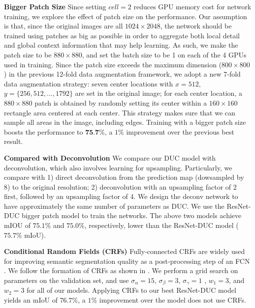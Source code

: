 \documentclass[10pt,twocolumn,letterpaper]{article}
\begin{document}
\textbf{Bigger Patch Size} Since setting $cell=2$ reduces GPU memory cost for network training, we explore the effect of patch size on the performance. Our assumption is that, since the original images are all $1024\times 2048$, the network should be trained using patches as big as possible in order to aggregate both local detail and global context information that may help learning. As such, we make the patch size to be $880\times 880$, and set the batch size to be 1 on each of the 4 GPUs used in training. Since the patch size exceeds the maximum dimension ($800\times 800$) in the previous 12-fold data augmentation framework, we adopt a new 7-fold data augmentation strategy: \iffalse \gary{Why can't you simply use 880-size patches in the same way?}\panqu{because the image is 1024x2048. Previously we use 2x6 configuration. Now since the patch is 880x880, so we can remove the height part.}\fi seven center locations with $x=512$, $y=\{256,512,...,1792\}$ are set in the original image; for each center location, a $880\times 880$ patch is obtained by randomly setting its center within a $160\times 160$ rectangle area centered at each center. This strategy makes sure that we can sample all areas in the image, including edges. Training with a bigger patch size boosts the performance to $\textbf{75.7\%}$, a $1\%$ improvement over the previous best result.

\textbf{Compared with Deconvolution}
We compare our DUC model with deconvolution, which also involves learning for upsampling. Particularly, we compare with 1) direct deconvolution from the prediction map (dowsampled by 8) to the original resolution; 2) deconvolution with an upsampling factor of 2 first, followed by an upsampling factor of 4. We design the deconv network to have approximately the same number of parameters as DUC. We use the ResNet-DUC bigger patch model to train the networks. The above two models achieve mIOU of $75.1\%$ and $75.0\%$, respectively, lower than the ResNet-DUC model ($75.7\%$ mIoU).

\textbf{Conditional Random Fields (CRFs)}
Fully-connected CRFs \cite{koltun2011efficient} are widely used for improving semantic segmentation quality as a post-processing step of an FCN \cite{chen2016deeplab}. We follow the formation of CRFs as shown in \cite{chen2016deeplab}. We perform a grid search on parameters on the validation set, and use $\sigma_{\alpha}=15$, $\sigma_{\beta}=3$, $\sigma_{\gamma}=1$ , $w_1=3$, and $w_2=3$ for all of our models. Applying CRFs to our best ResNet-DUC model yields an mIoU of $76.7\%$, a $1\%$ improvement over the model does not use CRFs.
\end{document}
